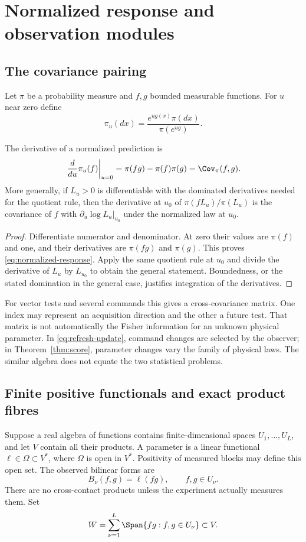\section{Normalized response and observation modules}\label{sec:response}
\subsection{The covariance pairing}
Let $\pi$ be a probability measure and $f,g$ bounded measurable functions.
For $u$ near zero define
\[
 \pi_u(dx)=\frac{e^{ug(x)}\pi(dx)}{\pi(e^{ug})}.
\]

\begin{proposition}\label{prop:normalized-response}
The derivative of a normalized prediction is
\begin{equation}\label{eq:normalized-response}
 \left.\frac{d}{du}\pi_u(f)\right|_{u=0}
 =\pi(fg)-\pi(f)\pi(g)=\Cov_\pi(f,g).
\end{equation}
More generally, if $L_u>0$ is differentiable with the dominated derivatives
needed for the quotient rule, then the derivative at $u_0$ of
$\pi(fL_u)/\pi(L_u)$ is the covariance of $f$ with
$\partial_u\log L_u|_{u_0}$ under the normalized law at $u_0$.
\end{proposition}
\begin{proof}
Differentiate numerator and denominator. At zero their values are $\pi(f)$
and one, and their derivatives are $\pi(fg)$ and $\pi(g)$. This proves
\eqref{eq:normalized-response}. Apply the same quotient rule at $u_0$
and divide the derivative of $L_u$ by $L_{u_0}$ to obtain the general
statement. Boundedness, or the stated domination in the general case,
justifies integration of the derivatives.
\end{proof}

For vector tests and several commands this gives a cross-covariance matrix.
One index may represent an acquisition direction and the other a future
test. That matrix is not automatically the Fisher information for an
unknown physical parameter. In \eqref{eq:refresh-update}, command changes
are selected by the observer; in Theorem~\ref{thm:score}, parameter changes
vary the family of physical laws. The similar algebra does not equate the
two statistical problems.

\subsection{Finite positive functionals and exact product fibres}
Suppose a real algebra of functions contains finite-dimensional spaces
$U_1,\ldots,U_L$, and let $V$ contain all their products. A parameter is a
linear functional $\ell\in\Omega\subset V^*$, where $\Omega$ is open in
$V^*$. Positivity of measured blocks may define this open set. The observed
bilinear forms are
\[
 B_\nu(f,g)=\ell(fg),\qquad f,g\in U_\nu.
\]
There are no cross-contact products unless the experiment actually measures
them. Set
\[
 W=\sum_{\nu=1}^L\Span\{fg:f,g\in U_\nu\}\subset V.
\]

